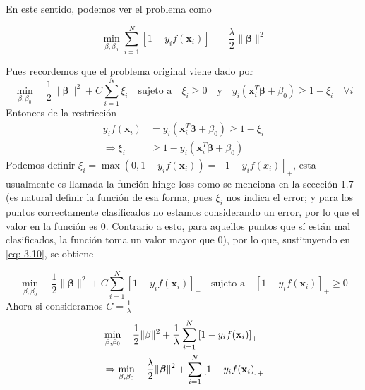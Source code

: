 \documentclass[letterpaper,12pt,oneside]{book}
\begin{document}
{{{{{En este sentido, podemos ver el problema como


\begin{equation}
    \min_{\beta,\beta_0} \sum_{i=1}^{N} \left[1 - y_i f(\mathbf{x}_i)\right]_+ + \frac{\lambda}{2} \|\boldsymbol{\beta}\|^2 
\end{equation}

Pues recordemos que el problema original viene dado por  
        \begin{equation}
            \min_{\beta, \beta_0} \quad \frac{1}{2} \|\boldsymbol{\beta}\|^2 + C \sum_{i=1}^{N} \xi_i \quad \text{sujeto a} \quad \xi_i \geq 0 \quad \text{y} \quad y_i (\mathbf{x}_i^T \boldsymbol{\beta} + \beta_0) \geq 1 - \xi_i \quad \forall i \label{eq: 3.10}
        \end{equation}
Entonces de la restricción
\begin{align*}
    y_i f(\mathbf{x}_i) &= y_i (\mathbf{x}_i^T \boldsymbol{\beta} + \beta_0) \geq 1 - \xi_i  \\
   \Rightarrow \xi_i &\geq  1-y_i (\mathbf{x}_i^T \boldsymbol{\beta} + \beta_0) 
\end{align*} 
Podemos definir $\xi_i = \max(0, 1 - y_i f(\mathbf{x}_i)) = \left[1 - y_i f(x_i)\right]_+$, esta usualmente es llamada la función hinge loss como se menciona en la seección 1.7 (es natural definir la función de esa forma, pues $\xi_i$ nos indica el error; y para los puntos correctamente clasificados no estamos considerando un error, por lo que el valor en la función es 0. Contrario a esto, para aquellos puntos que sí están mal clasificados, la función toma un valor mayor que 0), por lo que, sustituyendo en \eqref{eq: 3.10}, se obtiene

        \begin{equation}
            \min_{\beta, \beta_0} \quad \frac{1}{2} \|\boldsymbol{\beta}\|^2 + C \sum_{i=1}^{N} \left[1 - y_i f(\mathbf{x}_i)\right]_+ \quad \text{sujeto a} \quad \left[1 - y_i f(\mathbf{x}_i)\right]_+ \geq 0 
        \end{equation}
Ahora si consideramos $C=\frac{1}{\lambda}$ 
        \begin{align}
            &\min_{\beta, \beta_0} \quad \frac{1}{2} \|\beta\|^2 + \frac{1}{\lambda} \sum_{i=1}^{N} \left[1 - y_i f(\mathbf{x}_i)\right]_+  \notag \\
            & \Rightarrow \min_{\beta, \beta_0} \quad \frac{\lambda}{2} \|\boldsymbol{\beta}\|^2 + \sum_{i=1}^{N} \left[1 - y_i f(\mathbf{x}_i)\right]_+ \label{eq: 3.12}
        \end{align}


}}}}}
\end{document}
